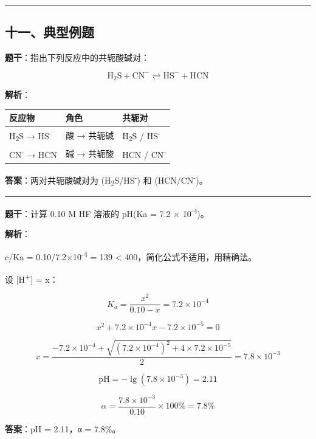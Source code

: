 \begin{center}\rule{0.5\linewidth}{0.5pt}\end{center}

\subsection{十一、典型例题}\label{ux5341ux4e00ux5178ux578bux4f8bux9898}

\textbf{题干}：指出下列反应中的共轭酸碱对：

\[
\mathrm{H_2S + CN^- \rightleftharpoons HS^- + HCN}
\]

\textbf{解析}：

{\def\LTcaptype{none} %
\begin{longtable}[]{@{}lll@{}}
\toprule\noalign{}
反应物 & 角色 & 共轭对 \\
\midrule\noalign{}
\endhead
\bottomrule\noalign{}
\endlastfoot
H\textsubscript{2}S → HS\textsuperscript{-} & 酸 → 共轭碱 & H\textsubscript{2}S / HS\textsuperscript{-} \\
CN\textsuperscript{-} → HCN & 碱 → 共轭酸 & HCN / CN\textsuperscript{-} \\
\end{longtable}
}

\textbf{答案}：两对共轭酸碱对为 (H\textsubscript{2}S/HS\textsuperscript{-}) 和 (HCN/CN\textsuperscript{-})。

\begin{center}\rule{0.5\linewidth}{0.5pt}\end{center}

\textbf{题干}：计算 0.10 M HF 溶液的 pH(Ka = 7.2 × 10\textsuperscript{-4})。

\textbf{解析}：

c/Ka = 0.10/7.2×10\textsuperscript{-4} = 139 \textless{} 400，简化公式不适用，用精确法。

设 {[}H\textsuperscript{+}{]} = x：

\[K_a = \frac{x^2}{0.10 - x} = 7.2 \times 10^{-4}\]

\[x^2 + 7.2 \times 10^{-4} x - 7.2 \times 10^{-5} = 0\]

\[x = \frac{-7.2 \times 10^{-4} + \sqrt{(7.2 \times 10^{-4})^2 + 4 \times 7.2 \times 10^{-5}}}{2} = 7.8 \times 10^{-3}\]

\[\mathrm{pH} = -\lg(7.8 \times 10^{-3}) = 2.11\]

\[\alpha = \frac{7.8 \times 10^{-3}}{0.10} \times 100\% = 7.8\%\]

\textbf{答案}：pH = 2.11，α = 7.8\%。

